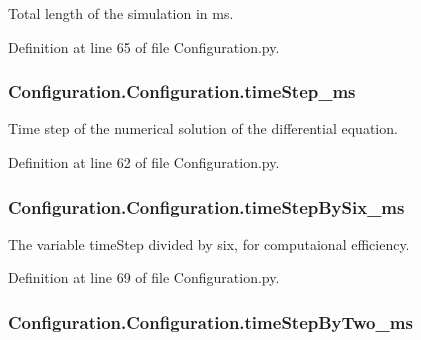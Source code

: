 Total length of the simulation in ms. 



Definition at line 65 of file Configuration.\+py.

\subsubsection[{\texorpdfstring{time\+Step\+\_\+ms}{timeStep_ms}}]{\setlength{\rightskip}{0pt plus 5cm}Configuration.\+Configuration.\+time\+Step\+\_\+ms}\hypertarget{class_configuration_1_1_configuration_a6379aaa6e54523ca81e3713d1846679b}{}\label{class_configuration_1_1_configuration_a6379aaa6e54523ca81e3713d1846679b}


Time step of the numerical solution of the differential equation. 



Definition at line 62 of file Configuration.\+py.

\subsubsection[{\texorpdfstring{time\+Step\+By\+Six\+\_\+ms}{timeStepBySix_ms}}]{\setlength{\rightskip}{0pt plus 5cm}Configuration.\+Configuration.\+time\+Step\+By\+Six\+\_\+ms}\hypertarget{class_configuration_1_1_configuration_aa49387a016f5d528136ab5812821cb99}{}\label{class_configuration_1_1_configuration_aa49387a016f5d528136ab5812821cb99}


The variable time\+Step divided by six, for computaional efficiency. 



Definition at line 69 of file Configuration.\+py.

\subsubsection[{\texorpdfstring{time\+Step\+By\+Two\+\_\+ms}{timeStepByTwo_ms}}]{\setlength{\rightskip}{0pt plus 5cm}Configuration.\+Configuration.\+time\+Step\+By\+Two\+\_\+ms}\hypertarget{class_configuration_1_1_configuration_a58f6e3bf5491f8fb229697fc3690aa12}{}\label{class_configuration_1_1_configuration_a58f6e3bf5491f8fb229697fc3690aa12}


